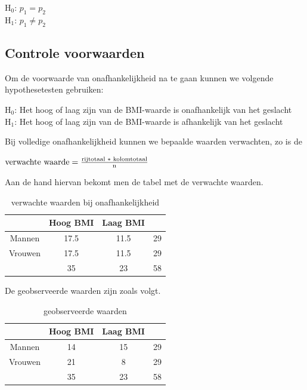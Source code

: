 \documentclass[11pt]{article}
\begin{document}
\begin{center}
H${_0}$: $p_{1} = p_{2}$ \\
H${_1}$: $p_{1} \neq p_{2}$
\end{center}

\subsection{Controle voorwaarden}
\label{subsec:control2}
Om de voorwaarde van onafhankelijkheid na te gaan kunnen we volgende hypothesetesten gebruiken:

\begin{center}
H${_0}$: Het hoog of laag zijn van de BMI-waarde is onafhankelijk van het geslacht\\
H${_1}$: Het hoog of laag zijn van de BMI-waarde is afhankelijk van het geslacht
\end{center}

Bij volledige onafhankelijkheid kunnen we bepaalde waarden verwachten, zo is de

\begin{center}
$\textnormal{verwachte waarde} = \frac{\textnormal{rijtotaal } * \textnormal{ kolomtotaal}}{\textnormal{n}}$
\end{center}

Aan de hand hiervan bekomt men de tabel met de verwachte waarden.

\begin{table}[h!]
\begin{center}
 \begin{tabular}{c | c c | c} 
  & Hoog BMI & Laag BMI \\
 \hline
 Mannen & 17.5 & 11.5 & 29\\ 
 Vrouwen & 17.5 & 11.5 & 29\\
 \hline
  & 35 & 23 & 58\\
\end{tabular}
\end{center}
\caption{verwachte waarden bij onafhankelijkheid}
\label{table:1}
\end{table}

De geobserveerde waarden zijn zoals volgt.

\begin{table}[h!]
\begin{center}
 \begin{tabular}{c | c c | c} 
  & Hoog BMI & Laag BMI \\
 \hline
 Mannen & 14 & 15 & 29\\ 
 Vrouwen & 21 & 8 & 29\\
 \hline
  & 35 & 23 & 58\\
\end{tabular}
\end{center}
\caption{geobserveerde waarden}
\label{table:2}
\end{table}
\end{document}
